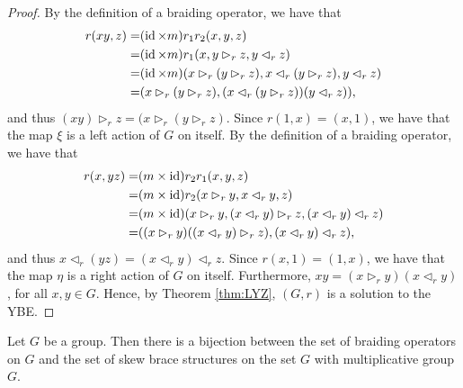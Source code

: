 \begin{proof}
By the definition of a braiding operator, we have that
    \begin{align*}
        r(xy,z)=& (\operatorname{id}\times m)r_1r_2(x,y,z)\\
        =&(\operatorname{id}\times m)r_1(x,y\rhd_r z,y\lhd_r z)\\
        =&(\operatorname{id}\times m)(x\rhd_r (y\rhd_r z),x\lhd_r (y\rhd_r z),y\lhd_r z)\\
        =&(x\rhd_r (y\rhd_r z),(x\lhd_r (y\rhd_r z))(y\lhd_r z)),
        \end{align*}
    and thus $(xy)\rhd_r z=(x\rhd_r (y\rhd_r z)$. Since $r(1,x)=(x,1)$, we have that the map $\xi$ is a left action of $G$ on itself.
    By the definition of a braiding operator, we have that
    \begin{align}\label{LYZequa1}
        r(x,yz)=& (m\times\operatorname{id})r_2r_1(x,y,z)\nonumber\\
        =&(m\times\operatorname{id})r_2(x\rhd_r y,x\lhd_r y,z)\nonumber\\
        =&(m\times\operatorname{id})(x\rhd_r y,(x\lhd_r y)\rhd_r z, (x\lhd_r y)\lhd_r z)\nonumber\\
        =&((x\rhd_r y)((x\lhd_r y)\rhd_r z), (x\lhd_r y)\lhd_r z),
        \end{align}
    and thus $x\lhd_r (yz)=(x\lhd_r y)\lhd_r z$. Since $r(x,1)=(1,x)$, we have that the map $\eta$ is a right action of $G$ on itself. Furthermore, $xy=(x\rhd_r y)(x\lhd_r y)$, for all $x,y\in G$. Hence, by Theorem \ref{thm:LYZ}, $(G,r)$ is a solution to the YBE.
\end{proof}

\begin{theorem}\label{thm:braidedbraces}
    Let $G$ be a group. Then there is a bijection between the set of braiding operators on $G$ and the set of skew brace structures on the set $G$ with multiplicative group $G$. 
\end{theorem}


